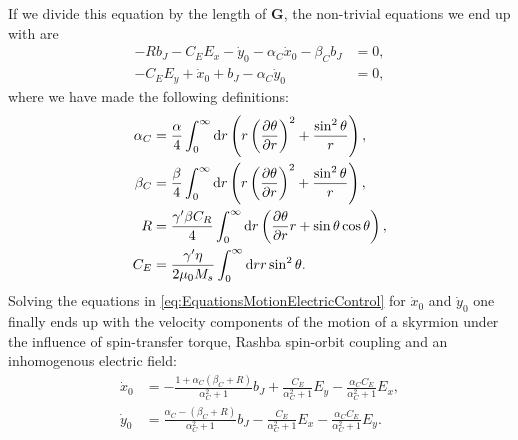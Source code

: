 If we divide this equation by the length of $\mathbold{G}$, the non-trivial equations we end up with are
\begin{subequations}
\label{eq:EquationsMotionElectricControl}
\begin{align}
- R b_J - C_E E_x - \dot{y}_0 - \alpha_C \dot{x}_0 - \beta_C b_J &= 0, \\
-C_E E_y + \dot{x}_0 + b_J -\alpha_C\dot{y}_0 &= 0,
\end{align}
\end{subequations}
where we have made the following definitions:
\begin{subequations}
\begin{align}
\alpha_C &= \frac{\alpha}{4} \int_0^{\infty} \operatorname{d}\!{r} \left(r\left(\frac{\partial \theta}{\partial r}\right)^2+\frac{\sin^2\theta}{r}\right), \\
\beta_C &=\frac{\beta}{4} \int_0^{\infty} \operatorname{d}\!{r} \left(r\left(\frac{\partial \theta}{\partial r}\right)^2+\frac{\sin^2\theta}{r}\right), \\
R &= \frac{\gamma'\beta C_R}{4} \int_0^{\infty} \operatorname{d}\!{r} \left(\frac{\partial \theta}{\partial r} r + \sin\theta\cos\theta \right), \label{eq:Rconst}\\
C_E &= \frac{\gamma' \eta}{2\mu_0 M_s}\int_0^{\infty}\operatorname{d}\!{r} r\sin^2\theta.
\end{align}
\end{subequations}
Solving the equations in \eqref{eq:EquationsMotionElectricControl} for $\dot{x}_0$ and $\dot{y}_0$ one finally ends up with the velocity components of the motion of a skyrmion under the influence of spin-transfer torque, Rashba spin-orbit coupling and an inhomogenous electric field:
\begin{subequations}
\label{eq:ElectricalSkyrmionVComponents}
\begin{align}
\dot{x}_0 &= - \frac{1+\alpha_C(\beta_C + R)}{\alpha_C^2+1}b_J + \frac{C_E}{\alpha_C^2+1}E_y - \frac{\alpha_C C_E}{\alpha_C^2+1}E_x, \\
\dot{y}_0 &= \frac{\alpha_C-(\beta_C + R)}{\alpha_C^2+1}b_J - \frac{C_E}{\alpha_C^2+1}E_x - \frac{\alpha_C C_E}{\alpha_C^2+1}E_y.
\end{align}
\end{subequations}
